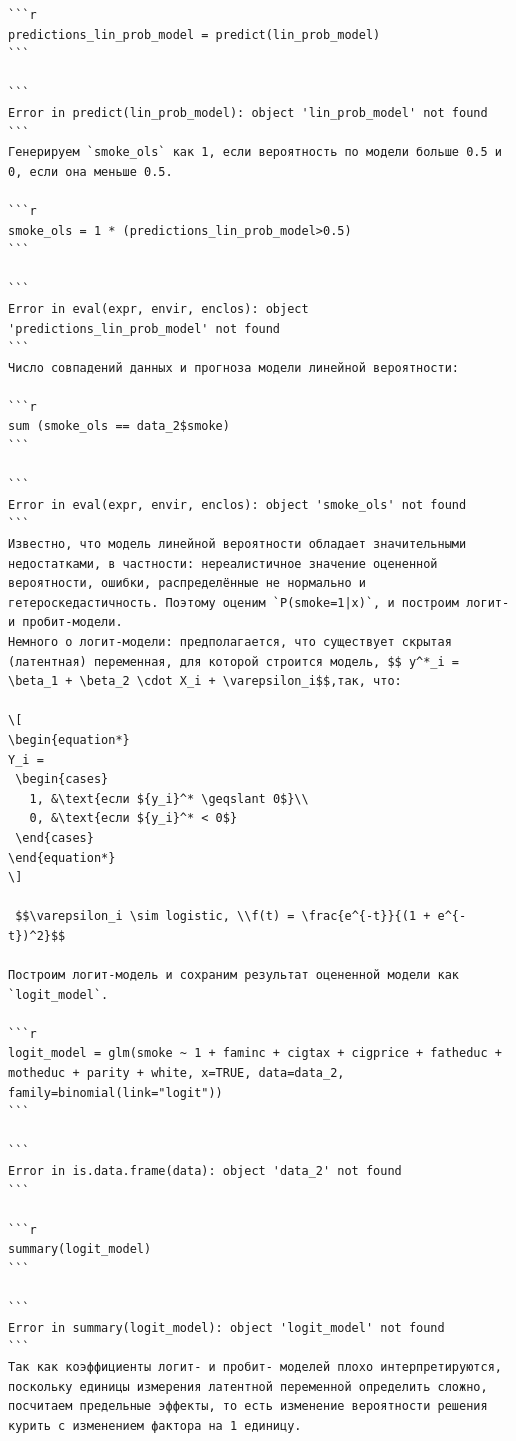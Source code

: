 \documentclass[]{book}
\begin{document}
\begin{verbatim}
```r
predictions_lin_prob_model = predict(lin_prob_model)
```

```
Error in predict(lin_prob_model): object 'lin_prob_model' not found
```
Генерируем `smoke_ols` как 1, если вероятность по модели больше 0.5 и 0, если она меньше 0.5.

```r
smoke_ols = 1 * (predictions_lin_prob_model>0.5)
```

```
Error in eval(expr, envir, enclos): object 'predictions_lin_prob_model' not found
```
Число совпадений данных и прогноза модели линейной вероятности:

```r
sum (smoke_ols == data_2$smoke)
```

```
Error in eval(expr, envir, enclos): object 'smoke_ols' not found
```
Известно, что модель линейной вероятности обладает значительными недостатками, в частности: нереалистичное значение оцененной вероятности, ошибки, распределённые не нормально и гетероскедастичность. Поэтому оценим `P(smoke=1|x)`, и построим логит- и пробит-модели. 
Немного о логит-модели: предполагается, что существует скрытая (латентная) переменная, для которой строится модель, $$ y^*_i = \beta_1 + \beta_2 \cdot X_i + \varepsilon_i$$,так, что:

\[
\begin{equation*}
Y_i = 
 \begin{cases}
   1, &\text{если ${y_i}^* \geqslant 0$}\\
   0, &\text{если ${y_i}^* < 0$}
 \end{cases}
\end{equation*}
\]

 $$\varepsilon_i \sim logistic, \\f(t) = \frac{e^{-t}}{(1 + e^{-t})^2}$$
 
Построим логит-модель и сохраним результат оцененной модели как `logit_model`.

```r
logit_model = glm(smoke ~ 1 + faminc + cigtax + cigprice + fatheduc + motheduc + parity + white, x=TRUE, data=data_2, family=binomial(link="logit"))
```

```
Error in is.data.frame(data): object 'data_2' not found
```

```r
summary(logit_model)
```

```
Error in summary(logit_model): object 'logit_model' not found
```
Так как коэффициенты логит- и пробит- моделей плохо интерпретируются, поскольку единицы измерения латентной переменной определить сложно, посчитаем предельные эффекты, то есть изменение вероятности решения курить с изменением фактора на 1 единицу. 


\end{verbatim}
\end{document}
